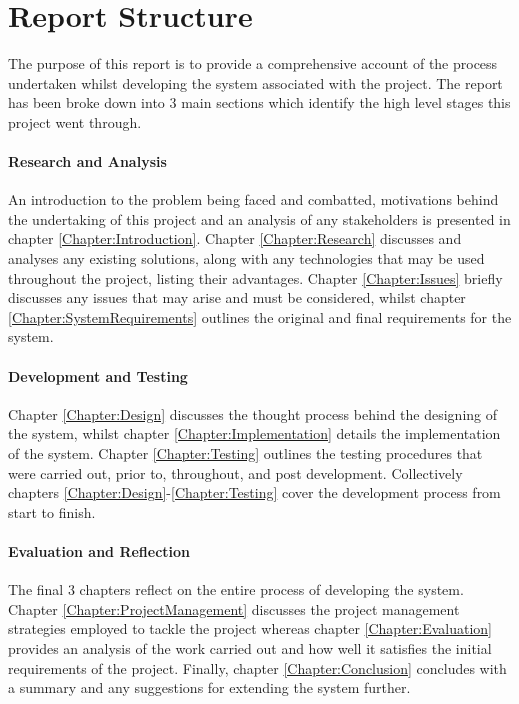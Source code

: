 \section{Report Structure}
The purpose of this report is to provide a comprehensive account of the process undertaken whilst developing the system associated with the project. The report has been broke down into 3 main sections which identify the high level stages this project went through.

\paragraph{Research and Analysis}
An introduction to the problem being faced and combatted, motivations behind the undertaking of this project and an analysis of any stakeholders is presented in chapter \ref{Chapter:Introduction}. Chapter \ref{Chapter:Research} discusses and analyses any existing solutions, along with any technologies that may be used throughout the project, listing their advantages. Chapter \ref{Chapter:Issues} briefly discusses any issues that may arise and must be considered, whilst chapter \ref{Chapter:SystemRequirements} outlines the original and final requirements for the system.

\paragraph{Development and Testing}
Chapter \ref{Chapter:Design} discusses the thought process behind the designing of the system, whilst chapter \ref{Chapter:Implementation} details the implementation of the system. Chapter \ref{Chapter:Testing} outlines the testing procedures that were carried out, prior to, throughout, and post development. Collectively chapters \ref{Chapter:Design}-\ref{Chapter:Testing} cover the development process from start to finish.

\paragraph{Evaluation and Reflection}
The final 3 chapters reflect on the entire process of developing the system. Chapter \ref{Chapter:ProjectManagement} discusses the project management strategies employed to tackle the project whereas chapter \ref{Chapter:Evaluation} provides an analysis of the work carried out and how well it satisfies the initial requirements of the project. Finally, chapter \ref{Chapter:Conclusion} concludes with a summary and any suggestions for extending the system further.
